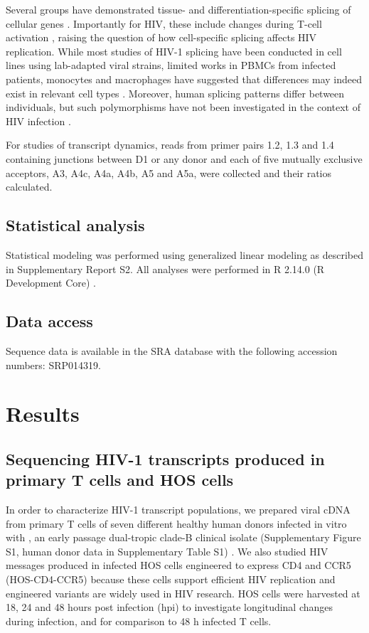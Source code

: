 \documentclass[../sherrill-Mix_thesis.tex]{subfiles}
\begin{document}

Several groups have demonstrated tissue- and differentiation-specific splicing of cellular genes \citep{Wang2008,Grabowski2011,Llorian2011}. Importantly for HIV, these include changes during T-cell activation \citep{Ip2007,Topp2008}, raising the question of how cell-specific splicing affects HIV replication. While most studies of HIV-1 splicing have been conducted in cell lines using lab-adapted viral strains, limited works in PBMCs from infected patients, monocytes and macrophages have suggested that differences may indeed exist in relevant cell types \citep{Carrera2010,Saltarelli1996,Sonza2002,Dowling2008}. Moreover, human splicing patterns differ between individuals, but such polymorphisms have not been investigated in the context of HIV infection \citep{Hull2007,Kwan2007}.

For studies of transcript dynamics, reads from primer pairs 1.2, 1.3 and 1.4 containing junctions between D1 or any donor and each of five mutually exclusive acceptors, A3, A4c, A4a, A4b, A5 and A5a, were collected and their ratios calculated. 

\subsection{Statistical analysis}
Statistical modeling was performed using generalized linear modeling as described in Supplementary Report S2. All analyses were performed in R 2.14.0 (R Development Core) \citep{RCoreTeam2012}. 

\subsection{Data access}
Sequence data is available in the SRA database with the following accession numbers: SRP014319.

\section{Results}
\subsection{Sequencing HIV-1 transcripts produced in primary T cells and HOS cells}
In order to characterize HIV-1 transcript populations, we prepared viral cDNA from primary \cdFour{} T cells of seven different healthy human donors infected in vitro with \hivEight{}, an early passage dual-tropic clade-B clinical isolate (Supplementary Figure S1, human donor data in Supplementary Table S1) \citep{Collman1992}. We also studied HIV messages produced in infected HOS cells engineered to express CD4 and CCR5 (HOS-CD4-CCR5) because these cells support efficient HIV replication and engineered variants are widely used in HIV research. HOS cells were harvested at 18, 24 and 48 hours post infection (hpi) to investigate longitudinal changes during infection, and for comparison to 48 h infected T cells.
\end{document}
